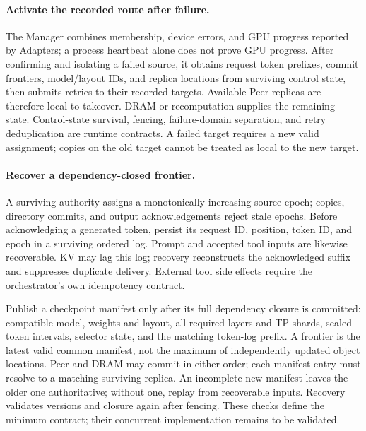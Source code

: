 \paragraph{Activate the recorded route after failure.}
The Manager combines membership, device errors, and GPU progress
reported by Adapters; a process heartbeat alone does not prove GPU
progress. After confirming and isolating a failed source, it obtains
request token prefixes, commit frontiers, model/layout IDs, and replica
locations from surviving control state, then submits retries to their
recorded targets. Available Peer replicas are therefore local to takeover.
DRAM or recomputation supplies the remaining state. Control-state
survival, fencing, failure-domain separation, and retry deduplication
are runtime contracts. A failed target requires a new valid assignment;
copies on the old target cannot be treated as local to the new target.

\paragraph{Recover a dependency-closed frontier.}
A surviving authority assigns a monotonically increasing source epoch;
copies, directory commits, and output acknowledgements reject stale epochs.
Before acknowledging a generated token, persist its request ID, position,
token ID, and epoch in a surviving ordered log. Prompt and accepted tool
inputs are likewise recoverable. KV may lag this log; recovery reconstructs
the acknowledged suffix and suppresses duplicate delivery. External tool
side effects require the orchestrator's own idempotency contract.

Publish a checkpoint manifest only after its full dependency closure is
committed: compatible model, weights and layout, all required layers and TP
shards, sealed token intervals, selector state, and the matching token-log
prefix. A frontier is the latest valid common manifest, not the maximum
of independently updated object locations. Peer and DRAM may commit in
either order; each manifest entry must resolve to a matching surviving
replica. An incomplete new manifest leaves the older one authoritative;
without one, replay from recoverable inputs. Recovery validates versions
and closure again after fencing. These checks define the minimum contract;
their concurrent implementation remains to be validated.

